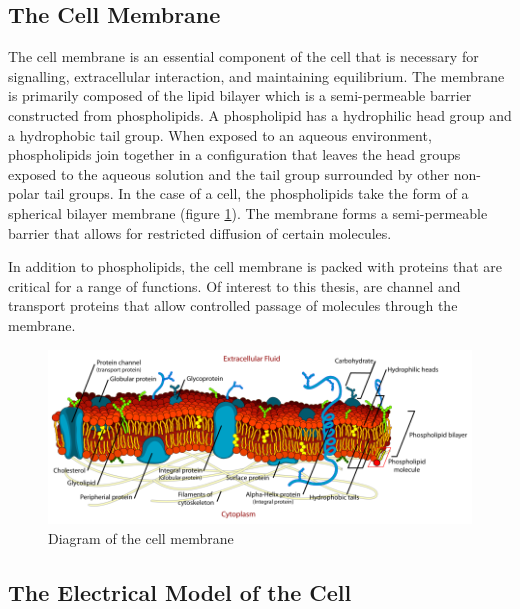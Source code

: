  \subsection{The Cell Membrane}
 \par The cell membrane is an essential component of the cell that is necessary for signalling, extracellular interaction, and maintaining equilibrium. The membrane is primarily composed of the lipid bilayer which is a semi-permeable barrier constructed from phospholipids. A phospholipid has a hydrophilic head group and a hydrophobic tail group. When exposed to an aqueous environment, phospholipids join together in a configuration that leaves the head groups exposed to the aqueous solution and the tail group surrounded by other non-polar tail groups. In the case of a cell, the phospholipids take the form of a spherical bilayer membrane (figure \ref{fig:cell_membrane}). The membrane forms a semi-permeable barrier that allows for restricted diffusion of certain molecules. 
 
 \par In addition to phospholipids, the cell membrane is packed with proteins that are critical for a range of functions. Of interest to this thesis, are channel and transport proteins that allow controlled passage of molecules through the membrane. 
 
 \begin{figure}[h]
    \centering
    \includegraphics[width=\textwidth]{images/Cell_membrane_detailed_diagram.png}
    \caption[Diagram of the cell membrane]{Diagram of the cell membrane \cite{mariana_ruiz_cell_????}}
    \label{fig:cell_membrane}
 \end{figure}
 
 
\subsection{The Electrical Model of the Cell}

